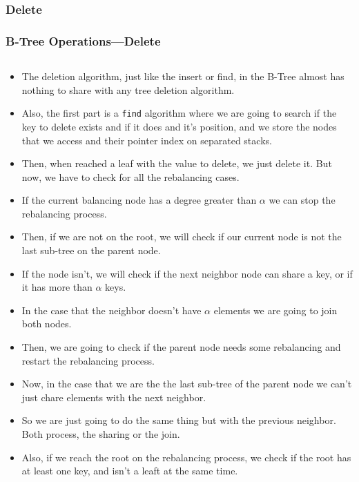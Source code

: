 \begin{frame}
    \subsubsection{Delete}
    \frametitle{B-Tree Operations---Delete}
    \begin{columns}
        \begin{column}{\textlecolumn}
            \begin{block}{}
                \begin{itemize}
                    \item The deletion algorithm, just like the insert or find, in the B-Tree almost has nothing to share with any tree deletion algorithm.
                    \item Also, the first part is a \lstinline|find| algorithm where we are going to search if the key to delete exists and if it does
                        and it's position, and we store the nodes that we access and their pointer index on separated stacks.
                    \item Then, when reached a leaf with the value to delete, we just delete it. But now, we have to check 
                        for all the rebalancing cases.
                    \item If the current balancing node has a degree greater than \(\alpha\) we can stop the rebalancing process.
                    \item Then, if we are not on the root, we will check if our current node is not the last sub-tree on the parent node.
                    \item If the node isn't, we will check if the next neighbor node can share a key, or if it has more than \(\alpha\) keys.
                    \item In the case that the neighbor doesn't have \(\alpha\) elements we are going to join both nodes.
                    \item Then, we are going to check if the parent node needs some rebalancing and restart the rebalancing process.
                    \item Now, in the case that we are the the last sub-tree of the parent node we can't just chare elements with the next neighbor.
                    \item So we are just going to do the same thing but with the previous neighbor. Both process, the sharing or the join.
                    \item Also, if we reach the root on the rebalancing process, we check if the root has at least one key, and isn't a leaft at the same time.

\end{itemize}
\end{block}
\end{column}
\end{columns}
\end{frame}
